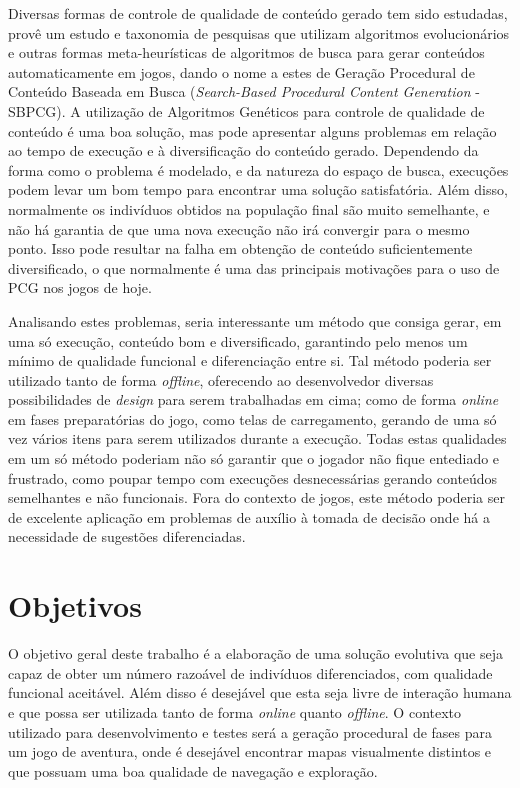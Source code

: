 Diversas formas de controle de qualidade de conteúdo gerado tem sido estudadas, \cite{togelius2011search} provê um estudo e taxonomia de pesquisas que utilizam algoritmos evolucionários e outras formas meta-heurísticas de algoritmos de busca para gerar conteúdos automaticamente em jogos, dando o nome a estes de Geração Procedural de Conteúdo Baseada em Busca (\emph{Search-Based Procedural Content Generation} - SBPCG). A utilização de Algoritmos Genéticos para controle de qualidade de conteúdo é uma boa solução, mas pode apresentar alguns problemas em relação ao tempo de execução e à diversificação do conteúdo gerado. Dependendo da forma como o problema é modelado, e da natureza do espaço de busca, execuções podem levar um bom tempo para encontrar uma solução satisfatória. Além disso, normalmente os indivíduos obtidos na população final são muito semelhante, e não há garantia de que uma nova execução não irá convergir para o mesmo ponto. Isso pode resultar na falha em obtenção de conteúdo suficientemente diversificado, o que normalmente é uma das principais motivações para o uso de PCG nos jogos de hoje.

Analisando estes problemas, seria interessante um método que consiga gerar, em uma só execução, conteúdo bom e diversificado, garantindo pelo menos um mínimo de qualidade funcional e diferenciação entre si. Tal método poderia ser utilizado tanto de forma \emph{offline}, oferecendo ao desenvolvedor diversas possibilidades de \emph{design} para serem trabalhadas em cima; como de forma \emph{online} em fases preparatórias do jogo, como telas de carregamento, gerando de uma só vez vários itens para serem utilizados durante a execução. Todas estas qualidades em um só método poderiam não só garantir que o jogador não fique entediado e frustrado, como poupar tempo com execuções desnecessárias gerando conteúdos semelhantes e não funcionais. Fora do contexto de jogos, este método poderia ser de excelente aplicação em problemas de auxílio à tomada de decisão onde há a necessidade de sugestões diferenciadas.

\section{Objetivos}

O objetivo geral deste trabalho é a elaboração de uma solução evolutiva que seja capaz de obter um número razoável de indivíduos diferenciados, com qualidade funcional aceitável. Além disso é desejável que esta seja livre de interação humana e que possa ser utilizada tanto de forma \emph{online} quanto \emph{offline}. O contexto utilizado para desenvolvimento e testes será a geração procedural de fases para um jogo de aventura, onde é desejável encontrar mapas visualmente distintos e que possuam uma boa qualidade de navegação e exploração.

